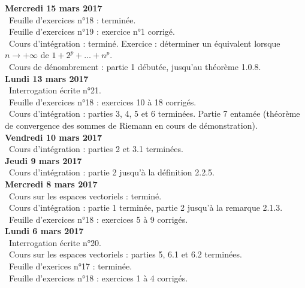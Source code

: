 \documentclass[12pt,a4paper]{article}
\begin{document}
\noindent\textbf{Mercredi 15  mars 2017}\\
\bu\ Feuille d'exercices n°18 : terminée.\\
\bu\ Feuille d'exercices n°19 : exercice n°1 corrigé.\\
\bu\ Cours d'intégration : terminé. Exercice : déterminer un équivalent lorsque $n \to +\infty$ de $1+2^p+\dots+n^p$.\\
\bu\ Cours de dénombrement : partie 1 débutée, jusqu'au théorème 1.0.8.\vspace{.4cm}\\

\noindent\textbf{Lundi 13 mars 2017}\\
\bu\ Interrogation écrite n°21.\\
\bu\ Feuille d'exercices n°18 : exercices 10 à 18 corrigés.\\
\bu\ Cours d'intégration : parties 3, 4, 5 et 6 terminées. Partie 7 entamée (théorème de convergence des sommes de Riemann en cours de démonstration).\vspace{.4cm}\\

\noindent\textbf{Vendredi 10 mars 2017}\\
\bu\ Cours d'intégration : parties 2 et 3.1 terminées.\vspace{.4cm}\\

\noindent\textbf{Jeudi 9 mars 2017}\\
\bu\ Cours d'intégration : partie 2 jusqu'à la définition 2.2.5.\vspace{.4cm}\\

\noindent\textbf{Mercredi 8 mars 2017}\\
\bu\ Cours sur les espaces vectoriels : terminé.\\
\bu\ Cours d'intégration : partie 1 terminée, partie 2 jusqu'à la remarque 2.1.3.\\
\bu\ Feuille d'exercices n°18 : exercices 5 à 9 corrigés.\vspace{.4cm}\\

\noindent\textbf{Lundi 6 mars 2017}\\
\bu\ Interrogation écrite n°20.\\
\bu\ Cours sur les espaces vectoriels :  parties 5, 6.1 et 6.2 terminées.\\
\bu\ Feuille d'exerices n°17 : terminée.\\
\bu\ Feuille d'exercices n°18 : exercices 1 à 4 corrigés.\vspace{.4cm}\\
\end{document}
